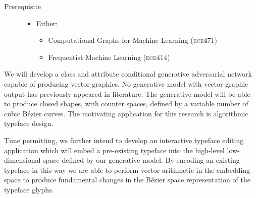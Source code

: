 \documentclass{article}
\begin{document}
\begin{description}
\item[Prerequisite] \hfill
  \begin{itemize}[leftmargin=-0.25cm]
    \item Either:
      \begin{itemize}
      \item Computational Graphs for Machine Learning ({\scshape ece}471) 
      \item Frequentist Machine Learning ({\scshape ece}414)
      \end{itemize}
  \end{itemize}
  
\end{description}

We will develop a class and attribute conditional generative
adversarial network capable of producing vector graphics. No
generative model with vector graphic output has previously appeared in
literature. The generative model will be able to produce closed
shapes, with counter spaces, defined by a variable number of cubic
Bézier curves. The motivating application for this research is
algorithmic typeface design.


Time permitting, we further intend to develop an interactive typeface
editing application which will embed a pre-existing typeface into the
high-level low-dimensional space defined by our generative model. By
encoding an existing typeface in this way we are able to perform
vector arithmetic in the embedding space to produce fundamental
changes in the Bézier space representation of the typeface glyphs.
\end{document}
